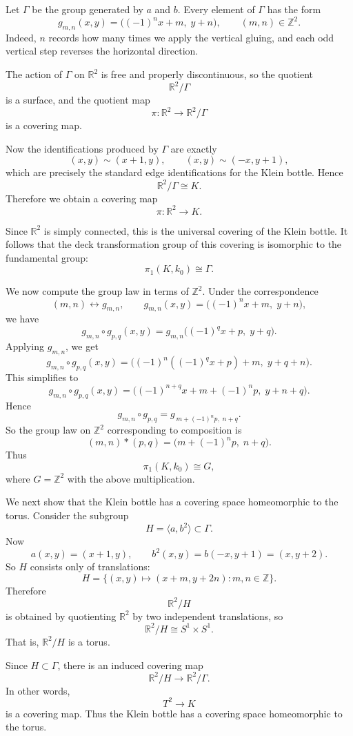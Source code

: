\documentclass[12pt,a4paper]{article}
\theoremstyle{notespace}
\begin{document}
Let \(\Gamma\) be the group generated by \(a\) and \(b\). Every element of \(\Gamma\) has the form
\[
g_{m,n}(x,y)=\bigl((-1)^n x+m,\; y+n\bigr),
\qquad (m,n)\in\mathbb Z^2.
\]
Indeed, \(n\) records how many times we apply the vertical gluing, and each odd vertical step reverses the horizontal direction.

The action of \(\Gamma\) on \(\mathbb R^2\) is free and properly discontinuous, so the quotient
\[
\mathbb R^2/\Gamma
\]
is a surface, and the quotient map
\[
\pi:\mathbb R^2\to \mathbb R^2/\Gamma
\]
is a covering map.

Now the identifications produced by \(\Gamma\) are exactly
\[
(x,y)\sim(x+1,y),
\qquad
(x,y)\sim(-x,y+1),
\]
which are precisely the standard edge identifications for the Klein bottle. Hence
\[
\mathbb R^2/\Gamma \cong K.
\]
Therefore we obtain a covering map
\[
\pi:\mathbb R^2\to K.
\]

Since \(\mathbb R^2\) is simply connected, this is the universal covering of the Klein bottle. It follows that the deck transformation group of this covering is isomorphic to the fundamental group:
\[
\pi_1(K,k_0)\cong \Gamma.
\]

We now compute the group law in terms of \(\mathbb Z^2\). Under the correspondence
\[
(m,n)\longleftrightarrow g_{m,n},
\qquad
g_{m,n}(x,y)=\bigl((-1)^n x+m,\; y+n\bigr),
\]
we have
\[
g_{m,n}\circ g_{p,q}(x,y)
=
g_{m,n}\bigl((-1)^q x+p,\; y+q\bigr).
\]
Applying \(g_{m,n}\), we get
\[
g_{m,n}\circ g_{p,q}(x,y)
=
\bigl((-1)^n((-1)^q x+p)+m,\; y+q+n\bigr).
\]
This simplifies to
\[
g_{m,n}\circ g_{p,q}(x,y)
=
\bigl((-1)^{n+q}x + m + (-1)^n p,\; y+n+q\bigr).
\]
Hence
\[
g_{m,n}\circ g_{p,q}=g_{\,m+(-1)^n p,\; n+q}.
\]
So the group law on \(\mathbb Z^2\) corresponding to composition is
\[
(m,n)*(p,q)=\bigl(m+(-1)^n p,\; n+q\bigr).
\]
Thus
\[
\pi_1(K,k_0)\cong G,
\]
where \(G=\mathbb Z^2\) with the above multiplication.

\medskip

We next show that the Klein bottle has a covering space homeomorphic to the torus. Consider the subgroup
\[
H=\langle a,b^2\rangle\subset \Gamma.
\]
Now
\[
a(x,y)=(x+1,y),
\qquad
b^2(x,y)=b(-x,y+1)=(x,y+2).
\]
So \(H\) consists only of translations:
\[
H=\{(x,y)\mapsto(x+m,y+2n):m,n\in\mathbb Z\}.
\]
Therefore
\[
\mathbb R^2/H
\]
is obtained by quotienting \(\mathbb R^2\) by two independent translations, so
\[
\mathbb R^2/H\cong S^1\times S^1.
\]
That is, \(\mathbb R^2/H\) is a torus.

Since \(H\subset \Gamma\), there is an induced covering map
\[
\mathbb R^2/H \to \mathbb R^2/\Gamma.
\]
In other words,
\[
T^2\to K
\]
is a covering map. Thus the Klein bottle has a covering space homeomorphic to the torus.
\end{document}
